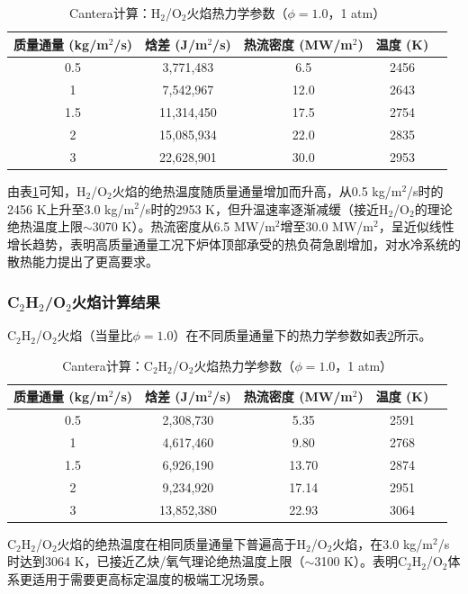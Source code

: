 \begin{table}[H]
	\centering
	\caption{Cantera计算：H$_2$/O$_2$火焰热力学参数（$\phi=1.0$，1 atm）}
	\label{tab:cantera_h2}
	\begin{tabular}{ccccc}
		\toprule
		质量通量 (kg/m$^2$/s) & 焓差 (J/m$^2$/s) & 热流密度 (MW/m$^2$) & 温度 (K) \\
		\midrule
		0.5 & 3,771,483 & 6.5 & 2456 \\
		1 & 7,542,967 & 12.0 & 2643 \\
		1.5 & 11,314,450 & 17.5 & 2754 \\
		2 & 15,085,934 & 22.0 & 2835 \\
		3 & 22,628,901 & 30.0 & 2953 \\
		\bottomrule
	\end{tabular}
\end{table}

由表\ref{tab:cantera_h2}可知，H$_2$/O$_2$火焰的绝热温度随质量通量增加而升高，从0.5 kg/m$^2$/s时的2456 K上升至3.0 kg/m$^2$/s时的2953 K，但升温速率逐渐减缓（接近H$_2$/O$_2$的理论绝热温度上限$\sim$3070 K）。热流密度从6.5 MW/m$^2$增至30.0 MW/m$^2$，呈近似线性增长趋势，表明高质量通量工况下炉体顶部承受的热负荷急剧增加，对水冷系统的散热能力提出了更高要求。

\subsubsection{C$_2$H$_2$/O$_2$火焰计算结果}

C$_2$H$_2$/O$_2$火焰（当量比$\phi=1.0$）在不同质量通量下的热力学参数如表\ref{tab:cantera_c2h2}所示。

\begin{table}[H]
	\centering
	\caption{Cantera计算：C$_2$H$_2$/O$_2$火焰热力学参数（$\phi=1.0$，1 atm）}
	\label{tab:cantera_c2h2}
	\begin{tabular}{ccccc}
		\toprule
		质量通量 (kg/m$^2$/s) & 焓差 (J/m$^2$/s) & 热流密度 (MW/m$^2$) & 温度 (K) \\
		\midrule
		0.5 & 2,308,730 & 5.35 & 2591 \\
		1 & 4,617,460 & 9.80 & 2768 \\
		1.5 & 6,926,190 & 13.70 & 2874 \\
		2 & 9,234,920 & 17.14 & 2951 \\
		3 & 13,852,380 & 22.93 & 3064 \\
		\bottomrule
	\end{tabular}
\end{table}

C$_2$H$_2$/O$_2$火焰的绝热温度在相同质量通量下普遍高于H$_2$/O$_2$火焰，在3.0 kg/m$^2$/s时达到3064 K，已接近乙炔/氧气理论绝热温度上限（$\sim$3100 K）。表明C$_2$H$_2$/O$_2$体系更适用于需要更高标定温度的极端工况场景。

